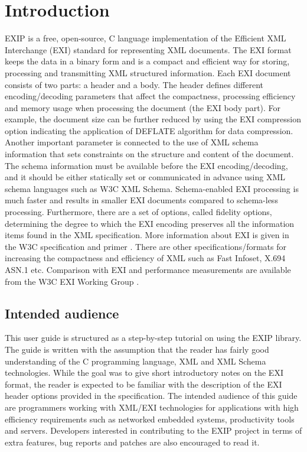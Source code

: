 \section{Introduction}
\label{sec:Introduction}

EXIP is a free, open-source, C language implementation of the Efficient XML Interchange (EXI) standard for representing XML documents.
The EXI format keeps the data in a binary form and is a compact and efficient way for storing, processing and transmitting
XML structured information. Each EXI document consists of two parts: a header and a body. The header defines different
encoding/decoding parameters that affect the compactness, processing efficiency and memory usage when processing the
document (the EXI body part). For example, the document size can be further reduced by using the EXI compression option indicating the
application of DEFLATE algorithm for data compression. Another important parameter is connected to the use of XML
schema information that sets constraints on the structure and content of the document. The schema information must
be available before the EXI encoding/decoding, and it should be either statically set or communicated in advance
using XML schema languages such as W3C XML Schema. Schema-enabled EXI processing is much faster and results in
smaller EXI documents compared to schema-less processing. Furthermore, there are a set of options, called fidelity
options, determining the degree to which the EXI encoding preserves all the information items found in the XML
specification. More information about EXI is given in the W3C specification \cite{EXI1} and
primer \cite{Peintner2009a}. There are other specifications/formats for increasing the compactness and efficiency
of XML such as Fast Infoset, X.694 ASN.1 etc. Comparison with EXI and performance measurements are available from
the W3C EXI Working Group \cite{Bournez2009, White2007}.

\subsection{Intended audience}
\label{sec:audience}
This user guide is structured as a step-by-step tutorial on using the EXIP library. The guide is written with the
assumption that the reader has fairly good understanding of the C programming language, XML and XML Schema technologies.
While the goal was to give short introductory notes on the EXI format, the reader is expected to be familiar with the
description of the EXI header options provided in the specification. The intended audience of this guide are
programmers working with XML/EXI technologies for applications with high efficiency requirements such as networked
embedded systems, productivity tools and servers. Developers interested in contributing to the EXIP project in
terms of extra features, bug reports and patches are also encouraged to read it.

